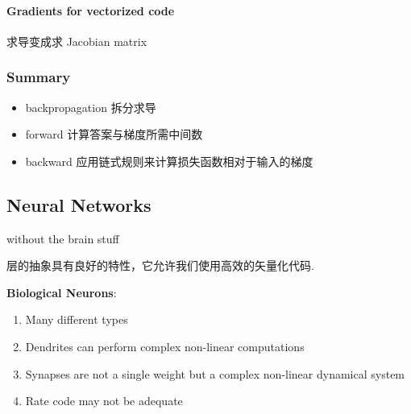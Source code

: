 \paragraph{Gradients for vectorized code} 求导变成求 Jacobian matrix
\subsubsection{Summary}
\begin{itemize}
    \item backpropagation 拆分求导
    \item forward 计算答案与梯度所需中间数
    \item backward 应用链式规则来计算损失函数相对于输入的梯度
\end{itemize}

\subsection{Neural Networks}
without the brain stuff

层的抽象具有良好的特性，它允许我们使用高效的矢量化代码. 

\textbf{Biological Neurons}:
\begin{enumerate}
    \item Many different types
    \item Dendrites can perform complex non-linear computations
    \item Synapses are not a single weight but a complex non-linear dynamical system
    \item Rate code may not be adequate
\end{enumerate}